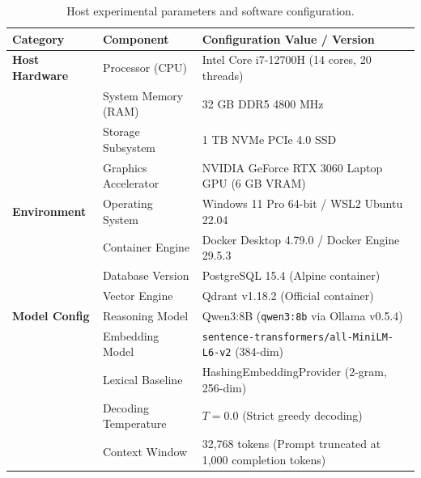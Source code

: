 \begin{table}[!htbp]
\centering
\caption{Host experimental parameters and software configuration.}
\label{tab:execution_parameters}
\small
\begin{tabularx}{\textwidth}{@{}l p{4.2cm} X@{}}
\toprule
\textbf{Category} & \textbf{Component} & \textbf{Configuration Value / Version} \\
\midrule
\textbf{Host Hardware} & Processor (CPU) & Intel Core i7-12700H (14 cores, 20 threads) \\
                       & System Memory (RAM) & 32 GB DDR5 4800 MHz \\
                       & Storage Subsystem & 1 TB NVMe PCIe 4.0 SSD \\
                       & Graphics Accelerator & NVIDIA GeForce RTX 3060 Laptop GPU (6 GB VRAM) \\
\midrule
\textbf{Environment}   & Operating System & Windows 11 Pro 64-bit / WSL2 Ubuntu 22.04 \\
                       & Container Engine & Docker Desktop 4.79.0 / Docker Engine 29.5.3 \\
                       & Database Version & PostgreSQL 15.4 (Alpine container) \\
                       & Vector Engine & Qdrant v1.18.2 (Official container) \\
\midrule
\textbf{Model Config}  & Reasoning Model & Qwen3:8B (\texttt{qwen3:8b} via Ollama v0.5.4) \\
                       & Embedding Model & \texttt{sentence-transformers/\allowbreak all-MiniLM-L6-v2} (384-dim) \\
                       & Lexical Baseline & HashingEmbeddingProvider (2-gram, 256-dim) \\
                       & Decoding Temperature & $T = 0.0$ (Strict greedy decoding) \\
                       & Context Window & 32,768 tokens (Prompt truncated at 1,000 completion tokens) \\
\bottomrule
\end{tabularx}
\end{table}